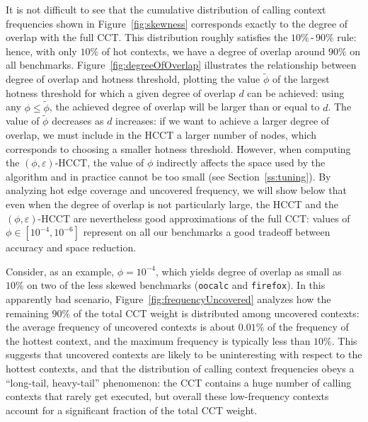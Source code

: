 \documentclass{sigplanconf}
\begin{document}
It is not difficult to see that the cumulative distribution  of calling context frequencies shown in Figure~\ref{fig:skewness} corresponds exactly to the degree of overlap with the full CCT. This distribution roughly satisfies the $10\%\,$-$\,90\%$ rule: hence, with only $10\%$ of hot contexts, we have a degree of overlap around $90\%$ on all benchmarks. Figure~\ref{fig:degreeOfOverlap} illustrates the relationship between degree of overlap and hotness threshold, plotting the value $\widetilde\phi$ of the largest hotness threshold  for which a given degree of overlap $d$ can be achieved: using any $\phi\leq\widetilde\phi$, the achieved degree of overlap will be larger than or equal to $d$. The value of $\widetilde\phi$ decreases as $d$ increases: if we want to achieve a larger degree of overlap, we must include in the HCCT a larger number of nodes, which corresponds to choosing a smaller hotness threshold. However, when computing the $(\phi,\varepsilon)$-HCCT, the value of $\phi$ indirectly affects the space used by the algorithm and in practice cannot be too small (see Section~\ref{ss:tuning}). By analyzing hot edge coverage and uncovered frequency, we will show below that even when the degree of overlap is not particularly large, the HCCT and the $(\phi,\varepsilon)$-HCCT are nevertheless good approximations of the full CCT: values of $\phi\in[10^{-4},10^{-6}]$ represent on all our benchmarks a good tradeoff between accuracy and space reduction.

Consider, as an example, $\phi=10^{-4}$, which yields degree of overlap as small as $10\%$ on two of the less skewed benchmarks ({\tt oocalc} and {\tt firefox}). In this apparently bad scenario, Figure~\ref{fig:frequencyUncovered} analyzes how the remaining $90\%$ of the total CCT weight is distributed among uncovered contexts: the average frequency of uncovered contexts is about $0.01\%$ of the frequency of the hottest context, and the maximum frequency is typically less than $10\%$. This suggests that uncovered contexts are likely to be uninteresting with respect to the hottest contexts, and that the distribution of calling context frequencies obeys a ``long-tail, heavy-tail'' phenomenon: the CCT contains a huge number of calling contexts that rarely get executed, but overall these low-frequency contexts account for a significant fraction of the total CCT weight. 
\end{document}
